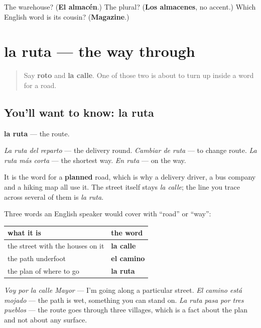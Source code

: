 \begin{tcolorbox}[breakable,colback=teal!4,colframe=teal!35!black,title={Before you move on}]
The warehouse? (\textbf{El almacén}.) The plural? (\textbf{Los almacenes}, no accent.) Which English word is its cousin? (\textbf{Magazine}.)
\end{tcolorbox}
\section[la ruta]{la ruta — the way through}

\label{lesson:ES-C452-ruta}



\begin{quote}
Say \textbf{roto} and \textbf{la calle}. One of those two is about to turn up inside a word for a road.
\end{quote}

\subsection*{You'll want to know: la ruta}
\textbf{la ruta} — the route.

\emph{La ruta del reparto} — the delivery round. \emph{Cambiar de ruta} — to change route. \emph{La ruta más corta} — the shortest way. \emph{En ruta} — on the way.

It is the word for a \textbf{planned} road, which is why a delivery driver, a bus company and a hiking map all use it. The street itself stays \emph{la calle}; the line you trace across several of them is \emph{la ruta}.

\begin{grammarlens}[title={Grammar Lens: ruta, camino, calle}]
Three words an English speaker would cover with \textquotedblleft{}road\textquotedblright{} or \textquotedblleft{}way\textquotedblright{}:

\noindent
\begin{tabularx}{\linewidth}{@{}>{\raggedright\arraybackslash}X>{\raggedright\arraybackslash}X@{}}
\toprule
\textbf{what it is} & \textbf{the word} \\
\midrule
the street with the houses on it & \textbf{la calle} \\
the path underfoot & \textbf{el camino} \\
the plan of where to go & \textbf{la ruta} \\
\bottomrule
\end{tabularx}

\emph{Voy por la calle Mayor} — I'm going along a particular street. \emph{El camino está mojado} — the path is wet, something you can stand on. \emph{La ruta pasa por tres pueblos} — the route goes through three villages, which is a fact about the plan and not about any surface.
\end{grammarlens}


